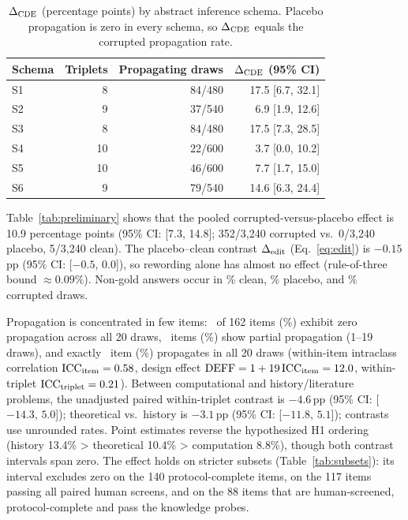 \begin{table}[!htb]\centering\small\setlength{\tabcolsep}{2pt}
\caption{$\Delta_{\mathrm{CDE}}$ (percentage points) by abstract inference schema. Placebo propagation is zero in every schema, so $\Delta_{\mathrm{CDE}}$ equals the corrupted propagation rate.}
\label{tab:schemas}
\begin{tabular}{@{}lrrr@{}}
\toprule Schema & Triplets & Propagating draws & $\Delta_{\mathrm{CDE}}$ (95\% CI) \\
\midrule
S1 & 8 & 84/480 & 17.5 [6.7, 32.1] \\
S2 & 9 & 37/540 & 6.9 [1.9, 12.6] \\
S3 & 8 & 84/480 & 17.5 [7.3, 28.5] \\
S4 & 10 & 22/600 & 3.7 [0.0, 10.2] \\
S5 & 10 & 46/600 & 7.7 [1.7, 15.0] \\
S6 & 9 & 79/540 & 14.6 [6.3, 24.4] \\
\bottomrule\end{tabular}
\end{table}

Table~\ref{tab:preliminary} shows that the pooled corrupted-versus-placebo effect is 10.9 percentage points (95\% CI: [7.3, 14.8]; 352/3,240 corrupted vs.\ 0/3,240 placebo, 5/3,240 clean). The placebo--clean contrast $\Delta_{\mathrm{edit}}$ (Eq.~\ref{eq:edit}) is $-0.15$\,pp (95\% CI: [$-0.5$, $0.0$]), so rewording alone has almost no effect (rule-of-three bound $\approx 0.09\%$). Non-gold answers occur in \NonGoldCleanPct\% clean, \NonGoldPlaceboPct\% placebo, and \NonGoldCorruptedPct\% corrupted draws.

Propagation is concentrated in few items: \ItemsZeroProp\ of 162 items (\ItemsZeroPropPct\%) exhibit zero propagation across all 20 draws, \ItemsPartialProp\ items (\ItemsPartialPropPct\%) show partial propagation (1--19 draws), and exactly \ItemsFullProp\ item (\ItemsFullPropPct\%) propagates in all 20 draws (within-item intraclass correlation $\text{ICC}_{\text{item}} = 0.58$, design effect $\text{DEFF} = 1 + 19\,\text{ICC}_{\text{item}} = 12.0$, within-triplet $\text{ICC}_{\text{triplet}} = 0.21$). Between computational and history/\allowbreak literature problems, the unadjusted paired within-triplet contrast is $-4.6$\,pp (95\% CI: [$-14.3$, $5.0$]); theoretical vs.\ history is $-3.1$\,pp (95\% CI: [$-11.8$, $5.1$]); contrasts use unrounded rates. Point estimates reverse the hypothesized H1 ordering (history 13.4\% > theoretical 10.4\% > computation 8.8\%), though both contrast intervals span zero. The effect holds on stricter subsets (Table~\ref{tab:subsets}): its interval excludes zero on the 140 protocol-complete items, on the 117 items passing all paired human screens, and on the 88 items that are human-screened, protocol-complete and pass the knowledge probes.

